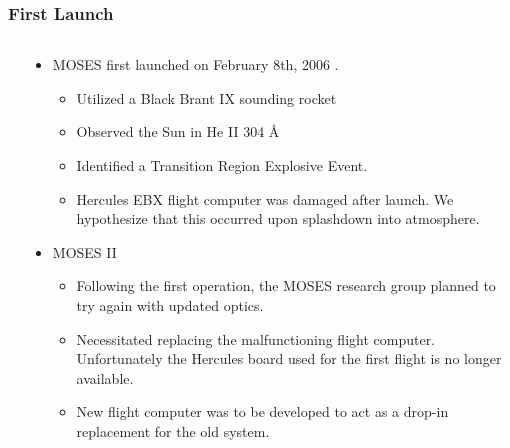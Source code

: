 \documentclass[landscape,xcolor={table}]{beamer}
\begin{document}
	\begin{frame}
		
		\frametitle{First Launch}
		
		\begin{columns}[T] %
		\begin{column}{.15\textwidth}

			
		\end{column}%
		\hfill%
		\begin{column}{.83\textwidth}
		
			\begin{itemize}
				\item MOSES first launched on February 8th, 2006 \cite{moses}.
				\begin{itemize}
					\item Utilized a Black Brant IX sounding rocket
					\item Observed the Sun in He II 304 \AA
					\item Identified a Transition Region Explosive Event.
					\item Hercules EBX flight computer was damaged after launch. We hypothesize that this occurred upon splashdown into atmosphere.
				\end{itemize}
				\item MOSES II
				\begin{itemize}
					\item Following the first operation, the MOSES research group planned to try again with updated optics.
					\item Necessitated replacing the malfunctioning flight computer. Unfortunately the Hercules board used for the first flight is no longer available.
					\item New flight computer was to be developed to act as a drop-in replacement for the old system.
				\end{itemize}
			\end{itemize}
		
		\end{column}%
		\end{columns}
	
	\end{frame}
		
\end{document}
